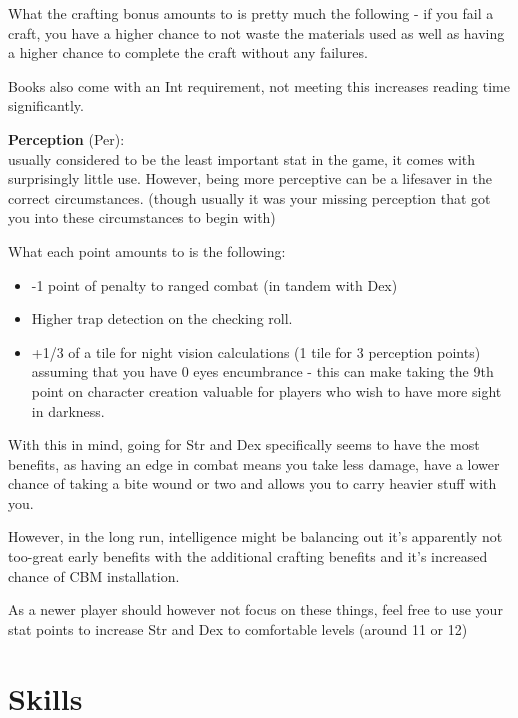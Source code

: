 What the crafting bonus amounts to is pretty much the following - if you fail a craft, you have a higher chance to not waste the materials used as well as having a higher chance to complete the craft without any failures.

Books also come with an Int requirement, not meeting this increases reading time significantly.

\textbf{Perception} (Per):\\usually considered to be the least important stat in the game, it comes with surprisingly little use. However, being more perceptive can be a lifesaver in the correct circumstances. (though usually it was your missing perception that got you into these circumstances to begin with)

What each point amounts to is the following:
\begin{itemize}
\item -1 point of penalty to ranged combat (in tandem with Dex)
\item Higher trap detection on the checking roll.
\item +1/3 of a tile for night vision calculations (1 tile for 3 perception points) assuming that you have 0 eyes encumbrance - this can make taking the 9th point on character creation valuable for players who wish to have more sight in darkness.
\end{itemize}

\vspace{1\baselineskip}
With this in mind, going for Str and Dex specifically seems to have the most benefits, as having an edge in combat means you take less damage, have a lower chance of taking a bite wound or two and allows you to carry heavier stuff with you.

However, in the long run, intelligence might be balancing out it's apparently not too-great early benefits with the additional crafting benefits and it's increased chance of CBM installation.

As a newer player should however not focus on these things, feel free to use your stat points to increase Str and Dex to comfortable levels (around 11 or 12)

\section{Skills}

